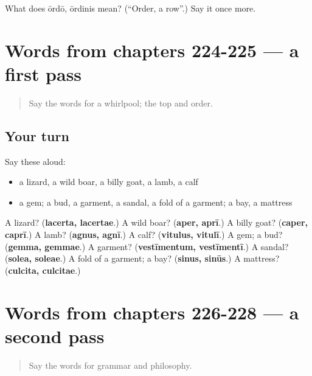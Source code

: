 \begin{tcolorbox}[breakable,colback=teal!4,colframe=teal!35!black,title={Before you move on}]
What does ōrdō, ōrdinis mean? (\textquotedblleft{}Order, a row\textquotedblright{}.) Say it once more.
\end{tcolorbox}
\section[(dialogue)]{Words from chapters 224-225 — a first pass}

\label{lesson:LA-R228-first-pass-words-from-chapters-224-225}



\begin{quote}
Say the words for a whirlpool; the top and order.
\end{quote}

\subsection*{Your turn}
Say these aloud:

\begin{itemize}
\raggedright
  \item a lizard, a wild boar, a billy goat, a lamb, a calf
  \item a gem; a bud, a garment, a sandal, a fold of a garment; a bay, a mattress
\end{itemize}

\begin{tcolorbox}[breakable,colback=teal!4,colframe=teal!35!black,title={Before you move on}]
A lizard? (\textbf{lacerta, lacertae}.) A wild boar? (\textbf{aper, aprī}.) A billy goat? (\textbf{caper, caprī}.) A lamb? (\textbf{agnus, agnī}.) A calf? (\textbf{vitulus, vitulī}.) A gem; a bud? (\textbf{gemma, gemmae}.) A garment? (\textbf{vestīmentum, vestīmentī}.) A sandal? (\textbf{solea, soleae}.) A fold of a garment; a bay? (\textbf{sinus, sinūs}.) A mattress? (\textbf{culcita, culcitae}.)
\end{tcolorbox}
\section[(dialogue)]{Words from chapters 226-228 — a second pass}

\label{lesson:LA-R228-second-pass-words-from-chapters-226-228}



\begin{quote}
Say the words for grammar and philosophy.
\end{quote}

